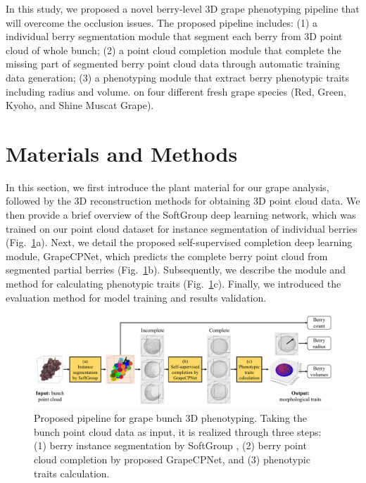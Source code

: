 \documentclass[12pt]{article}
\begin{document}
In this study, we proposed a novel berry-level 3D grape phenotyping pipeline that will overcome the occlusion issues. 
The proposed pipeline includes: 
(1) a individual berry segmentation module that segment each berry from 3D point cloud of whole bunch; 
(2) a point cloud completion module that complete the missing part of segmented berry point cloud data through automatic training data generation; 
(3) a phenotyping module that extract berry phenotypic traits including radius and volume. 
 on four different fresh grape species (Red, Green, Kyoho, and Shine Muscat Grape).

\section{Materials and Methods}

In this section, we first introduce the plant material for our grape analysis, followed by the 3D reconstruction methods for obtaining 3D point cloud data. 
We then provide a brief overview of the SoftGroup \citep{vu_softgroup_2022} deep learning network, which was trained on our point cloud dataset for instance segmentation of individual berries (Fig.~\ref{fig:raw1}a). 
Next, we detail the proposed self-supervised completion deep learning module, GrapeCPNet, which predicts the complete berry point cloud from segmented partial berries (Fig.~\ref{fig:raw1}b). 
Subsequently, we describe the module and method for calculating phenotypic traits (Fig.~\ref{fig:raw1}c). 
Finally, we introduced the evaluation method for model training and results validation.

\begin{figure}[hbt!]
    \centering
    \includegraphics[width=1\textwidth]{figures/Figure1.pdf}
    \caption{Proposed pipeline for grape bunch 3D phenotyping. Taking the bunch point cloud data as input, it is realized through three steps: (1) berry instance segmentation by SoftGroup \citep{vu_softgroup_2022}, (2) berry point cloud completion by proposed GrapeCPNet, and (3) phenotypic traits calculation.}
    \label{fig:raw1}
\end{figure}
\end{document}
